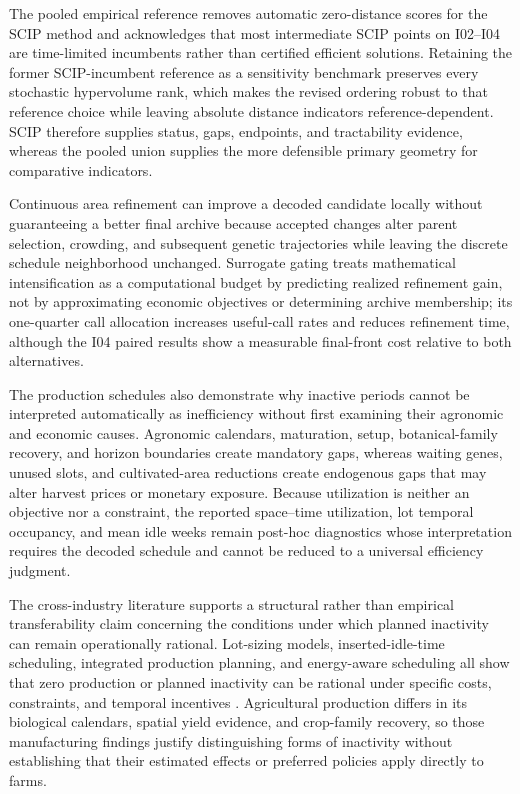 \documentclass[]{interact}
\begin{document}
The pooled empirical reference removes automatic zero-distance scores for the SCIP method and acknowledges that most intermediate SCIP points on I02--I04 are time-limited incumbents rather than certified efficient solutions. Retaining the former SCIP-incumbent reference as a sensitivity benchmark preserves every stochastic hypervolume rank, which makes the revised ordering robust to that reference choice while leaving absolute distance indicators reference-dependent. SCIP therefore supplies status, gaps, endpoints, and tractability evidence, whereas the pooled union supplies the more defensible primary geometry for comparative indicators.

Continuous area refinement can improve a decoded candidate locally without guaranteeing a better final archive because accepted changes alter parent selection, crowding, and subsequent genetic trajectories while leaving the discrete schedule neighborhood unchanged. Surrogate gating treats mathematical intensification as a computational budget by predicting realized refinement gain, not by approximating economic objectives or determining archive membership; its one-quarter call allocation increases useful-call rates and reduces refinement time, although the I04 paired results show a measurable final-front cost relative to both alternatives.

The production schedules also demonstrate why inactive periods cannot be interpreted automatically as inefficiency without first examining their agronomic and economic causes. Agronomic calendars, maturation, setup, botanical-family recovery, and horizon boundaries create mandatory gaps, whereas waiting genes, unused slots, and cultivated-area reductions create endogenous gaps that may alter harvest prices or monetary exposure. Because utilization is neither an objective nor a constraint, the reported space--time utilization, lot temporal occupancy, and mean idle weeks remain post-hoc diagnostics whose interpretation requires the decoded schedule and cannot be reduced to a universal efficiency judgment.

The cross-industry literature supports a structural rather than empirical transferability claim concerning the conditions under which planned inactivity can remain operationally rational. Lot-sizing models, inserted-idle-time scheduling, integrated production planning, and energy-aware scheduling all show that zero production or planned inactivity can be rational under specific costs, constraints, and temporal incentives \citep{WagnerWhitin1958,KanetSridharan2000,Jodlbauer2006,TrevinoMartinez2022,An2023}. Agricultural production differs in its biological calendars, spatial yield evidence, and crop-family recovery, so those manufacturing findings justify distinguishing forms of inactivity without establishing that their estimated effects or preferred policies apply directly to farms.
\end{document}
